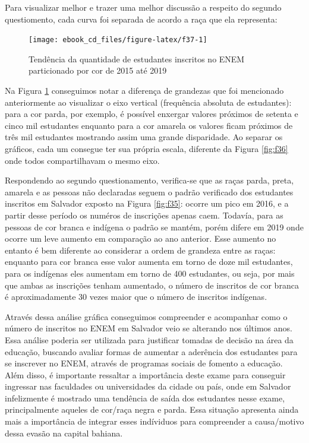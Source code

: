 \documentclass[
  portuguese,
  oneside]{book}
\begin{document}
Para visualizar melhor e trazer uma melhor discussão a respeito do segundo questiomento, cada curva foi separada de acordo a raça que ela representa:

\begin{figure}

{\centering \texttt{[image: ebook\_cd\_files/figure-latex/f37-1]} 

}

\caption{Tendência da quantidade de estudantes inscritos no ENEM particionado por cor de 2015 até 2019}\label{fig:f37}
\end{figure}

Na Figura \ref{fig:f37} conseguimos notar a diferença de grandezas que foi mencionado anteriormente ao visualizar o eixo vertical (frequência absoluta de estudantes): para a cor parda, por exemplo, é possível enxergar valores próximos de setenta e cinco mil estudantes enquanto para a cor amarela os valores ficam próximos de três mil estudantes mostrando assim uma grande disparidade. Ao separar os gráficos, cada um consegue ter sua própria escala, diferente da Figura \ref{fig:f36} onde todos compartilhavam o mesmo eixo.

Respondendo ao segundo questionamento, verifica-se que as raças parda, preta, amarela e as pessoas não declaradas seguem o padrão verificado dos estudantes inscritos em Salvador exposto na Figura \ref{fig:f35}: ocorre um pico em 2016, e a partir desse período os numéros de inscrições apenas caem. Todavía, para as pessoas de cor branca e indígena o padrão se mantém, porém difere em 2019 onde ocorre um leve aumento em comparação ao ano anterior. Esse aumento no entanto é bem diferente ao considerar a ordem de grandeza entre as raças: enquanto para cor branca esse valor aumenta em torno de doze mil estudantes, para os indígenas eles aumentam em torno de 400 estudantes, ou seja, por mais que ambas as inscrições tenham aumentado, o número de inscritos de cor branca é aproximadamente 30 vezes maior que o número de inscritos indígenas.

Através dessa análise gráfica conseguimos compreender e acompanhar como o número de inscritos no ENEM em Salvador veio se alterando nos últimos anos. Essa análise poderia ser utilizada para justificar tomadas de decisão na área da educação, buscando avaliar formas de aumentar a aderência dos estudantes para se inscrever no ENEM, através de programas sociais de fomento a educação. Além disso, é importante ressaltar a importância deste exame para conseguir ingressar nas faculdades ou universidades da cidade ou país, onde em Salvador infelizmente é mostrado uma tendência de saída dos estudantes nesse exame, principalmente aqueles de cor/raça negra e parda. Essa situação apresenta ainda mais a importância de integrar esses indíviduos para compreender a causa/motivo dessa evasão na capital bahiana.
\end{document}
